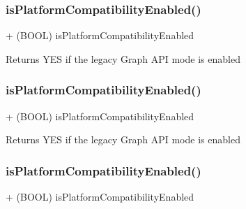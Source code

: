 \subsubsection{\texorpdfstring{is\+Platform\+Compatibility\+Enabled()}{isPlatformCompatibilityEnabled()}\hspace{0.1cm}{\footnotesize\ttfamily [3/5]}}
{\footnotesize\ttfamily + (B\+O\+OL) is\+Platform\+Compatibility\+Enabled \begin{DoxyParamCaption}{ }\end{DoxyParamCaption}}

Returns Y\+ES if the legacy Graph A\+PI mode is enabled \mbox{\label{interfaceFBSettings_a257796e070b7f063dedaa95706946134}} 
\subsubsection{\texorpdfstring{is\+Platform\+Compatibility\+Enabled()}{isPlatformCompatibilityEnabled()}\hspace{0.1cm}{\footnotesize\ttfamily [4/5]}}
{\footnotesize\ttfamily + (B\+O\+OL) is\+Platform\+Compatibility\+Enabled \begin{DoxyParamCaption}{ }\end{DoxyParamCaption}}

Returns Y\+ES if the legacy Graph A\+PI mode is enabled \mbox{\label{interfaceFBSettings_a257796e070b7f063dedaa95706946134}} 
\subsubsection{\texorpdfstring{is\+Platform\+Compatibility\+Enabled()}{isPlatformCompatibilityEnabled()}\hspace{0.1cm}{\footnotesize\ttfamily [5/5]}}
{\footnotesize\ttfamily + (B\+O\+OL) is\+Platform\+Compatibility\+Enabled \begin{DoxyParamCaption}{ }\end{DoxyParamCaption}}

